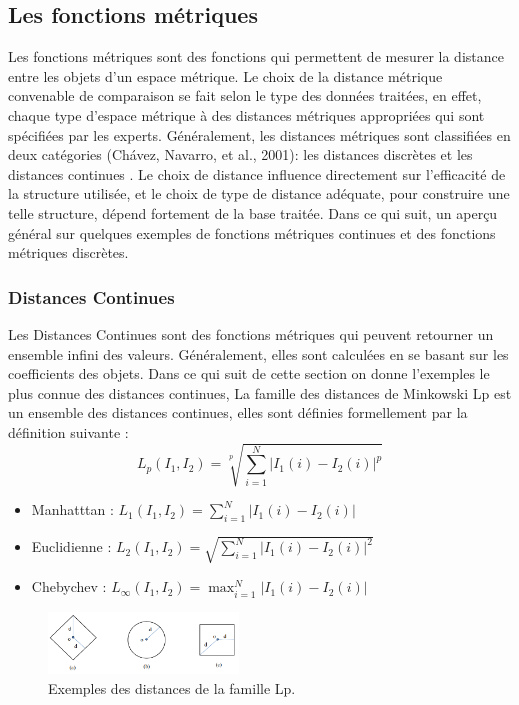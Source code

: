 \subsection{Les fonctions métriques}
Les fonctions métriques sont des fonctions qui permettent de mesurer la distance entre les objets d’un espace métrique. Le choix de la distance métrique convenable de comparaison se fait selon le type des données traitées, en effet, chaque type d’espace métrique à des distances métriques appropriées qui sont spécifiées par les experts. Généralement, les distances métriques sont classifiées en deux catégories (Chávez, Navarro, et al., 2001): les distances
discrètes et les distances continues . Le choix de distance influence directement sur l’efficacité de la structure utilisée, et le choix de type de distance adéquate, pour construire une telle structure, dépend fortement de la base traitée. Dans ce qui suit, un aperçu général sur quelques exemples de fonctions métriques continues et des fonctions métriques discrètes.

\subsubsection{Distances Continues}
Les Distances Continues sont des fonctions métriques qui peuvent retourner un
ensemble infini des valeurs. Généralement, elles sont calculées en se basant sur les coefficients des objets. Dans ce qui suit de cette section on donne l'exemples le plus connue des distances continues, La famille des distances de Minkowski Lp est un ensemble des distances continues, elles
sont définies formellement par la définition suivante :
\begin{equation}
L_p(I_1, I_2) = \sqrt[p]{\sum_{i=1}^{N}  \left|{I}_{1}(i)-{I}_{2}(i)\right|^p} 
\end{equation}

\begin{itemize}
	\item Manhatttan :  $  L_1(I_1, I_2) = \sum_{i=1}^{N} \left|{I}_{1}(i)-{I}_{2}(i)\right|  $ 
	
	\item Euclidienne : $ L_2(I_1, I_2) =  \sqrt{\sum_{i=1}^{N} \left|{I}_{1}(i)-{I}_{2}(i)\right|^2} $
	
	\item Chebychev : 
	$L_{\infty}(I_1, I_2)=\max_{i=1}^N \left|{I}_{1}(i)-{I}_{2}(i)\right|$  
\end{itemize}

\begin{figure}[H]
	\centering
	\includegraphics[width=0.45\textwidth]{Figures/mink} %
	\caption{Exemples des distances de la famille Lp.}
\end{figure}

